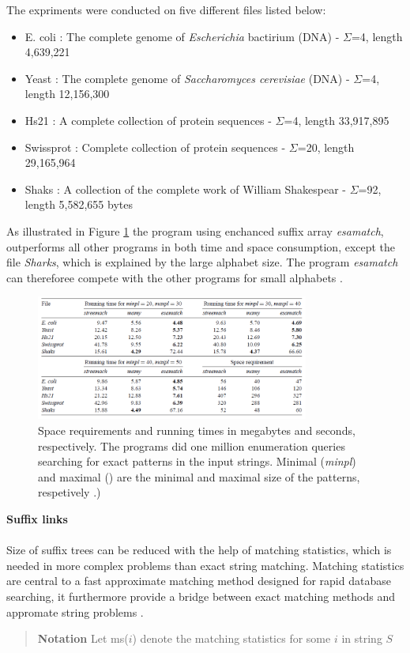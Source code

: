 \documentclass[12pt]{article} %
\begin{document}
The expriments were conducted on five different files listed below:
\begin{itemize} label{FILES}  
\item E. coli : The complete genome of \emph{Escherichia} bactirium (DNA) - $\Sigma$=4, length 4,639,221 
\item Yeast : The complete genome of \emph{Saccharomyces cerevisiae} (DNA) - $\Sigma$=4, length 12,156,300 
\item Hs21 : A complete collection of protein sequences - $\Sigma$=4, length 33,917,895
\item Swissprot : Complete collection of protein sequences - $\Sigma$=20, length 29,165,964
\item Shaks : A collection of the complete work of William Shakespear - $\Sigma$=92, length 5,582,655 bytes
\end{itemize}

As illustrated in Figure \ref{fig:TopDown} the program using enchanced suffix array \emph{esamatch}, outperforms all other programs in both time and space consumption, except the file \emph{Sharks}, which is explained by the large alphabet size. The program \emph{esamatch} can thereforee compete with the other programs for small alphabets \cite{enchancedsuffix}.


\begin{figure}[H]
    \centering
    \includegraphics[width=0.8\textwidth]{TopDown}
    \captionsetup{width=0.8
    \textwidth}
    \caption{Space requirements and running times in megabytes and seconds, respectively. The programs did one million enumeration queries searching for exact patterns in the input strings. Minimal (\emph{minpl}) and maximal () are the minimal and maximal size of the patterns, respetively \cite{enchancedsuffix}.)}
    \label{fig:TopDown}
    
\end{figure}
\textbf{Suffix links}
\\ \\
Size of suffix trees can be reduced with the help of matching statistics, which is needed in more complex problems than exact string matching. Matching statistics are central to a fast approximate matching method designed for rapid database searching, it furthermore provide a bridge between exact matching methods and appromate string problems \cite{gusfield}.
\begin{quote}
\textbf{Notation} 
Let ms($i$) denote the matching statistics for some $i$ in string $S$
\end{quote}
\end{document}
